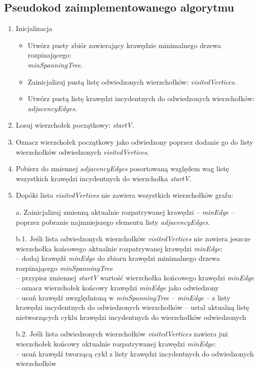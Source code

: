 \subsection{Pseudokod zaimplementowanego algorytmu}
\begin{enumerate}
	\item Inicjalizacja
	\begin{itemize}
		\item Utwórz pusty zbiór zawierający krawędzie minimalnego drzewa rozpinającego: \\ \emph{minSpanningTree}.
		\item Zainicjalizuj pustą listę odwiedzonych wierzchołków: \emph{visitedVertices}.
		\item Utwórz pustą listę krawędzi incydentnych do odwiedzonych wierzchołków: \emph{adjacencyEdges}.
	\end{itemize}

	\item Losuj wierzchołek początkowy: \emph{startV}.
	\item Oznacz wierzchołek początkowy jako odwiedzony poprzez dodanie go do listy wierzchołków odwiedzonych \emph{visitedVertices}.
	\item Pobierz do zmiennej \emph{adjacencyEdges} posortowaną względem wag listę wszystkich krawędzi incydentnych do wierzchołka \emph{startV}.
	\item Dopóki lista \emph{visitedVertices} nie zawiera wszystkich wierzchołków grafu:
	\item[a.] Zainicjalizuj zmienną aktualnie rozpatrywanej krawędzi -- \emph{minEdge} -- poprzez pobranie najmniejszego elementu listy \emph{adjacencyEdges}.
	\item[b.1.] Jeśli lista odwiedzonych wierzchołków \emph{visitedVertices} nie zawiera jeszcze wierzchołka końcowego aktualnie rozpatrywanej krawędzi \emph{minEdge}:\\
	-- dodaj krawędź \emph{minEdge} do zbioru krawędzi minimalnego drzewa rozpinającego \emph{minSpanningTree}\\
	-- przypisz zmiennej \emph{startV} wartość wierzchołka końcowego krawędzi \emph{minEdge}\\
	-- oznacz wierzchołek końcowy krawędzi \emph{minEdge } jako odwiedzony \\
	-- usuń krawędź uwzględnioną w \emph{minSpanningTree} -- \emph{minEdge} -- z listy krawędzi incydentnych do odwiedzonych wierzchołków
	-- ustal aktualną listę nietworzących cyklu krawędzi incydentnych do wierzchołków odwiedzonych
	\item[b.2.] Jeśli lista odwiedzonych wierzchołków \emph{visitedVertices} zawiera już wierzchołek końcowy aktualnie rozpatrywanej krawędzi \emph{minEdge}:\\
	-- usuń krawędź tworzącą cykl z listy krawędzi incydentnych do odwiedzonych wierzchołków\\
\end{enumerate} 

